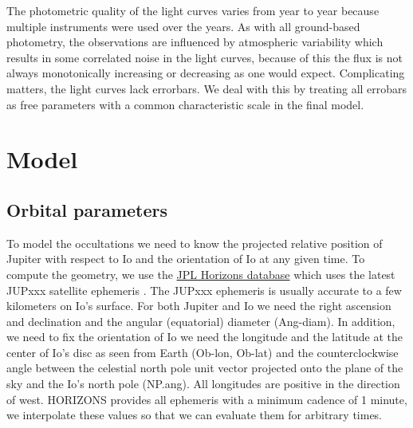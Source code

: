 \documentclass[modern]{aastex62}
\begin{document}
The photometric quality of the light curves varies from year to year because multiple instruments were used over the years. 
As with all ground-based photometry, the observations are influenced by atmospheric variability which results in some correlated noise in the light curves, because of this the flux is not always monotonically increasing or decreasing as one would expect.
Complicating matters, the light curves lack errorbars. 
We deal with this by treating all errobars as free parameters with a common characteristic scale in the final model.


\section{Model}
\label{sec:model}
\subsection{Orbital parameters}
\label{ssec:orbital_parameters}
To model the occultations we need to know the projected relative position of Jupiter with respect to Io and the orientation of Io at any given time.
To compute the geometry, we use the \href{https://ssd.jpl.nasa.gov/horizons.cgi}{JPL Horizons database} which uses the latest JUPxxx satellite ephemeris \citep{jacobson2015}.
The JUPxxx ephemeris is usually accurate to a few kilometers on Io's surface.
For both Jupiter and Io we need the right ascension and declination and the angular (equatorial) diameter (\textsf{Ang-diam}).
In addition, we need to fix the orientation of Io we need the longitude and the latitude at the center of Io's disc as seen from Earth (\textsf{Ob-lon}, \textsf{Ob-lat}) and the counterclockwise angle between the celestial north pole unit vector projected onto the plane of the sky and the Io's north pole (\textsf{NP.ang}).
All longitudes are positive  in the direction of west.
\textsf{HORIZONS} provides all ephemeris with a minimum cadence of 1 minute, we interpolate these values so that we can evaluate them for arbitrary times.
\end{document}
